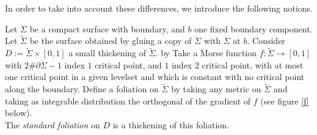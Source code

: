 \documentclass[../main.tex]{subfiles}
\begin{document}
In order to take into account these differences, we introduce the following notions.

\begin{definition}
Let $\dot \Sigma$ be a compact surface with boundary, and $b$ one fixed boundary component. Let $\widetilde\Sigma$ be the surface obtained by gluing a copy of $\dot{\Sigma}$ with $\dot\Sigma$ at $b$. Consider $D := \widetilde{\Sigma}\times [0,1]$ a small thickening of $\widetilde{\Sigma}$.   by Take a Morse function $f: \widetilde{\Sigma}\rightarrow[0,1]$ with $2\#\partial\dot\Sigma - 1$ index $1$ critical point, and $1$ index $2$ critical point, with at most one critical point in a given levelset and which is constant with no critical point along the boundary. Define a foliation on $\widetilde{\Sigma}$ by taking any metric on $\widetilde{\Sigma}$ and taking as integrable distribution the orthogonal of the gradient of $f$ (see figure \ref{f} below).\\
The \textit{standard foliation} on $D$ is a thickening of this foliation.
\end{definition}
\end{document}
